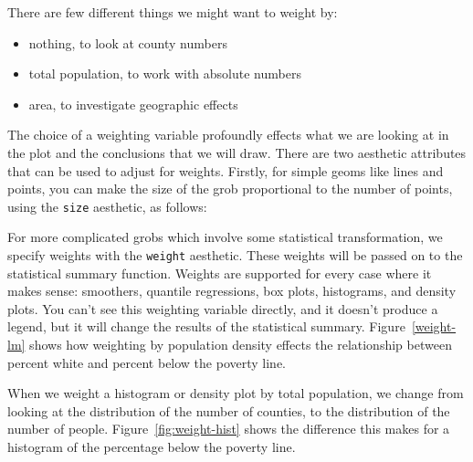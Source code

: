 There are few different things we might want to weight by: 

\begin{itemize}
  \item nothing, to look at county numbers
  \item total population, to work with absolute numbers
  \item area, to investigate geographic effects
\end{itemize}

\noindent The choice of a weighting variable profoundly effects what we are looking at in the plot and the conclusions that we will draw.  There are two aesthetic attributes that can be used to adjust for weights.  Firstly, for simple geoms like lines and points, you can make the size of the grob proportional to the number of points, using the {\tt size} aesthetic, as follows:

%


For more complicated grobs which involve some statistical transformation, we specify weights with the {\tt weight} aesthetic.  These weights will be passed on to the statistical summary function.  Weights are supported for every case where it makes sense: smoothers, quantile regressions, box plots, histograms, and density plots.  You can't see this weighting variable directly, and it doesn't produce a legend, but it will change the results of the statistical summary.  Figure~\ref{weight-lm} shows how weighting by population density effects the relationship between percent white and percent below the poverty line.

%


When we weight a histogram or density plot by total population, we change from looking at the distribution of the number of counties, to the distribution of the number of people.  Figure~\ref{fig:weight-hist} shows the difference this makes for a histogram of the percentage below the poverty line.

%



